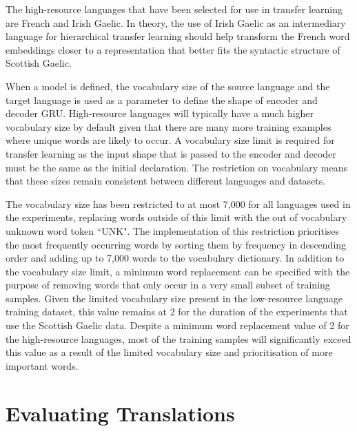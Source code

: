 The high-resource languages that have been selected for use in transfer learning are French and Irish Gaelic. In theory, the use of Irish Gaelic as an intermediary language for hierarchical transfer learning should help transform the French word embeddings closer to a representation that better fits the syntactic structure of Scottish Gaelic.


%
When a model is defined, the vocabulary size of the source language and the target language is used as a parameter to define the shape of encoder and decoder \acrshort{GRU}. High-resource languages will typically have a much higher vocabulary size by default given that there are many more training examples where unique words are likely to occur. A vocabulary size limit is required for transfer learning as the input shape that is passed to the encoder and decoder must be the same as the initial declaration. The restriction on vocabulary means that these sizes remain consistent between different languages and datasets.

The vocabulary size has been restricted to at most 7,000 for all languages used in the experiments, replacing words outside of this limit with the out of vocabulary unknown word token ``UNK". The implementation of this restriction prioritises the most frequently occurring words by sorting them by frequency in descending order and adding up to 7,000 words to the vocabulary dictionary.
In addition to the vocabulary size limit, a minimum word replacement can be specified with the purpose of removing words that only occur in a very small subset of training samples. Given the limited vocabulary size present in the low-resource language training dataset, this value remains at 2 for the duration of the experiments that use the Scottish Gaelic data. Despite a minimum word replacement value of 2 for the high-resource languages, most of the training samples will significantly exceed this value as a result of the limited vocabulary size and prioritisation of more important words.



\section{Evaluating Translations}
\label{sec:3-evaluating}

